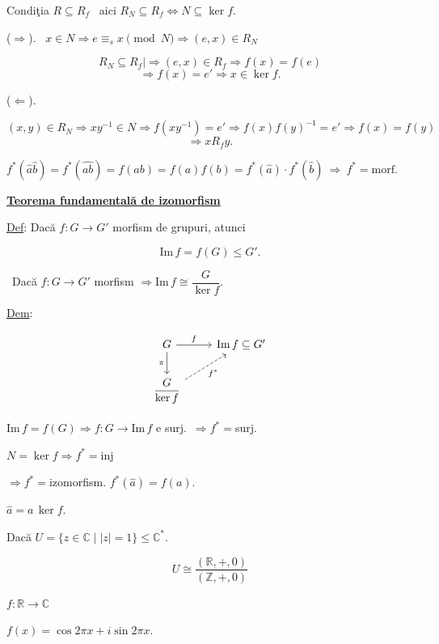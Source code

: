 \noindent Condiţia $R\subseteq R_f$ \ aici $R_N\subseteq R_f \Leftrightarrow N\subseteq\ker f$.

\bigskip
\noindent ($\Rightarrow$). \ $x\in N \Rightarrow e\equiv_s x \pmod N \Rightarrow (e,x)\in R_N$

\[
R_N\subseteq R_f \Big| \Rightarrow (e,x)\in R_f \Rightarrow f(x)=f(e)
\]
\[
\Rightarrow f(x)=e' \Rightarrow x\in\ker f.
\]

\bigskip
\noindent ($\Leftarrow$).

\[
(x,y)\in R_N \Rightarrow xy^{-1}\in N \Rightarrow f(xy^{-1})=e' \Rightarrow f(x)f(y)^{-1}=e' \Rightarrow f(x)=f(y)
\]
\[
\Rightarrow xR_fy.
\]

\bigskip
\noindent $f^*(\hat a\hat b) = f^*(\widehat{ab}) = f(ab) = f(a)f(b) = f^*(\hat a)\cdot f^*(\hat b) \ \Rightarrow \ f^*=\text{morf.}$

\bigskip
\begin{center}
\underline{\textbf{Teorema fundamentală de izomorfism}}
\end{center}

\noindent\underline{Def}: Dacă $f:G\to G'$ morfism de grupuri, atunci

\[
\text{Im}\,f = f(G) \leq G'.
\]

\bigskip
\noindent{} \ Dacă $f:G\to G'$ morfism $\Rightarrow \text{Im}\,f \cong \dfrac{G}{\ker f}$.

\bigskip
\noindent\underline{Dem}:

\[
\begin{tikzcd}
G \arrow[r,"f"] \arrow[d,"\pi"'] & \text{Im}\,f \subseteq G' \\
\dfrac{G}{\ker f} \arrow[ur, dashed,"f^*"'] &
\end{tikzcd}
\]

\bigskip
\noindent $\text{Im}\,f=f(G) \Rightarrow f:G\to\text{Im}\,f$ e surj.\ $\Rightarrow f^*=$surj.

\noindent $N=\ker f \Rightarrow f^*=$inj

\noindent $\Rightarrow f^*=$izomorfism. \quad $f^*(\hat a) = f(a)$.

\noindent $\hat a = a\,\ker f$.

\bigskip
\noindent Dacă $U=\{z\in\mathbb{C} \mid |z|=1\} \leq \mathbb{C}^*$.

\[
U \cong \frac{(\mathbb{R},+,0)}{(\mathbb{Z},+,0)}
\]

\noindent $f:\mathbb{R}\to\mathbb{C}$

\noindent $f(x) = \cos 2\pi x + i\sin 2\pi x$.




